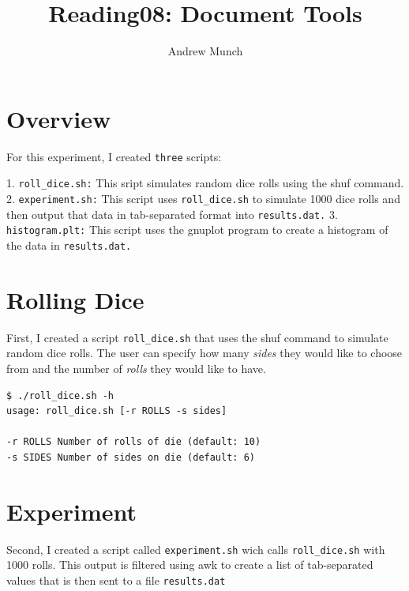 \documentclass{article}
\title{Reading08: Document Tools}
\date{}
\author{Andrew Munch}
\begin{document}
\maketitle


\section*{Overview}

For this experiment, I created \verb|three| scripts:

   1. \verb|roll_dice.sh:| This sript simulates random dice rolls using the shuf command.
   2. \verb|experiment.sh:| This script uses \verb|roll_dice.sh| to simulate 1000 dice rolls and then output that data in tab-separated format into \verb|results.dat.|
   3. \verb|histogram.plt:| This script uses the gnuplot program to create a histogram of the data in \verb|results.dat.|


\section*{Rolling Dice}

First, I created a script \verb|roll_dice.sh| that uses the shuf command to simulate random dice rolls.  The user can specify how many {\it sides} they would like to choose from and the number of {\it rolls} they would like to have.

\begin{verbatim}
$ ./roll_dice.sh -h
usage: roll_dice.sh [-r ROLLS -s sides]

-r ROLLS Number of rolls of die (default: 10)
-s SIDES Number of sides on die (default: 6)
\end{verbatim}


\section*{Experiment}

Second, I created a script called \verb|experiment.sh| wich calls \verb|roll_dice.sh| with 1000 rolls.  This output is filtered using awk to create a list of tab-separated values that is then sent to a file \verb|results.dat|

\end{document}
